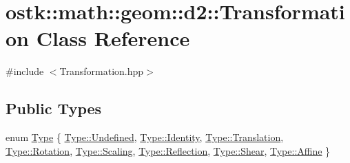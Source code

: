 \hypertarget{classostk_1_1math_1_1geom_1_1d2_1_1_transformation}{}\section{ostk\+:\+:math\+:\+:geom\+:\+:d2\+:\+:Transformation Class Reference}
\label{classostk_1_1math_1_1geom_1_1d2_1_1_transformation}


{\ttfamily \#include $<$Transformation.\+hpp$>$}

\subsection*{Public Types}
\begin{DoxyCompactItemize}
\item 
enum \hyperlink{classostk_1_1math_1_1geom_1_1d2_1_1_transformation_ad98045429a325b64040ef419cb68bea9}{Type} \{ \newline
\hyperlink{classostk_1_1math_1_1geom_1_1d2_1_1_transformation_ad98045429a325b64040ef419cb68bea9aec0fc0100c4fc1ce4eea230c3dc10360}{Type\+::\+Undefined}, 
\hyperlink{classostk_1_1math_1_1geom_1_1d2_1_1_transformation_ad98045429a325b64040ef419cb68bea9ac9c5c65fb4af9cf90eb99b3b84424189}{Type\+::\+Identity}, 
\hyperlink{classostk_1_1math_1_1geom_1_1d2_1_1_transformation_ad98045429a325b64040ef419cb68bea9a6dd08874f83507e9c7b23f1a46b7fa7c}{Type\+::\+Translation}, 
\hyperlink{classostk_1_1math_1_1geom_1_1d2_1_1_transformation_ad98045429a325b64040ef419cb68bea9af1a42bd417390fc63b030a519624607a}{Type\+::\+Rotation}, 
\newline
\hyperlink{classostk_1_1math_1_1geom_1_1d2_1_1_transformation_ad98045429a325b64040ef419cb68bea9abc967dc2d57e6eff184a821bf7577a80}{Type\+::\+Scaling}, 
\hyperlink{classostk_1_1math_1_1geom_1_1d2_1_1_transformation_ad98045429a325b64040ef419cb68bea9aaea1e492943ccbad7ee270ec1e064758}{Type\+::\+Reflection}, 
\hyperlink{classostk_1_1math_1_1geom_1_1d2_1_1_transformation_ad98045429a325b64040ef419cb68bea9a02414922b70cc0f9d7c841b0c70a0f94}{Type\+::\+Shear}, 
\hyperlink{classostk_1_1math_1_1geom_1_1d2_1_1_transformation_ad98045429a325b64040ef419cb68bea9a5b525aab6e200981a842101f1bcbafc6}{Type\+::\+Affine}
 \}
\end{DoxyCompactItemize}
